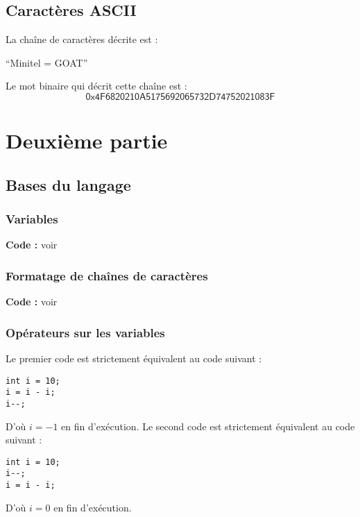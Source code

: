 \documentclass[../main.tex]{subfiles}
\begin{document}
\subsection{Caractères ASCII}
 La chaîne de caractères décrite est : 
\begin{center}
``Minitel = GOAT''
\end{center}
 Le mot binaire qui décrit cette chaîne est :
$$\textsf{0x4F6820210A5175692065732D74752021083F}$$
\section{Deuxième partie}
\subsection{Bases du langage}
\subsubsection{Variables}

\textbf{Code :} voir 
\subsubsection{Formatage de chaînes de caractères}

\textbf{Code :} voir 
\subsubsection{Opérateurs sur les variables}
 
Le premier code est strictement équivalent au code suivant :
\begin{verbatim}
int i = 10;
i = i - i;
i--;
\end{verbatim}
D'où $i = -1$ en fin d'exécution. 
Le second code est strictement équivalent au code suivant :
\begin{verbatim}
int i = 10;
i--;
i = i - i;
\end{verbatim}
D'où $i = 0$ en fin d'exécution.
 
\end{document}
